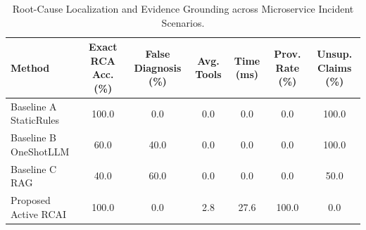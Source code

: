 \begin{table}[t]
\centering
\small
\caption{Root-Cause Localization and Evidence Grounding across Microservice Incident Scenarios.}
\label{tab:benchmark_comparison}
\begin{tabular}{lcccccc}
\toprule
\textbf{Method} & \textbf{Exact RCA Acc. (\%)} & \textbf{False Diagnosis (\%)} & \textbf{Avg. Tools} & \textbf{Time (ms)} & \textbf{Prov. Rate (\%)} & \textbf{Unsup. Claims (\%)} \\
\midrule
Baseline A StaticRules & 100.0 & 0.0 & 0.0 & 0.0 & 0.0 & 100.0 \\
Baseline B OneShotLLM & 60.0 & 40.0 & 0.0 & 0.0 & 0.0 & 100.0 \\
Baseline C RAG & 40.0 & 60.0 & 0.0 & 0.0 & 0.0 & 50.0 \\
Proposed Active RCAI & 100.0 & 0.0 & 2.8 & 27.6 & 100.0 & 0.0 \\
\bottomrule
\end{tabular}
\end{table}
